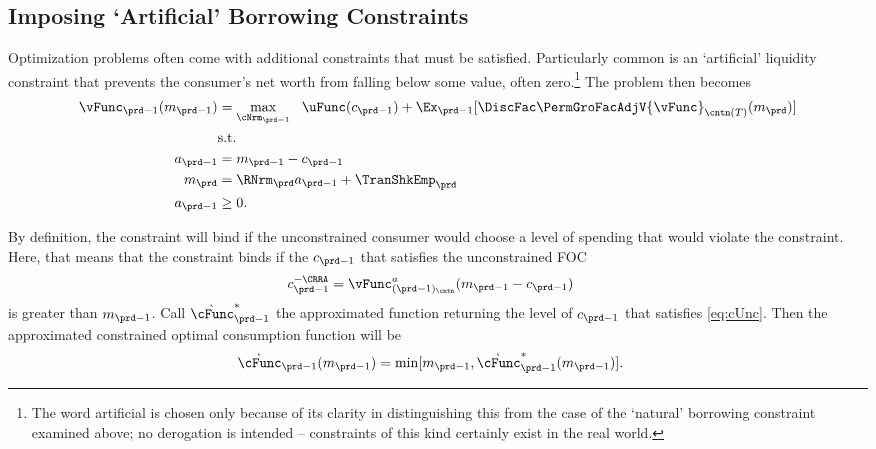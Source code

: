\subsection{Imposing `Artificial' Borrowing Constraints}

Optimization problems often come with additional constraints that must
be satisfied.  Particularly common is an `artificial' liquidity constraint that
prevents the consumer's net worth from falling below some value, often
zero.\footnote{The word artificial is chosen only because of its clarity in distinguishing
  this from the case of the `natural' borrowing constraint examined above; no derogation is
  intended -- constraints of this kind certainly exist in the real world.}  The problem then becomes
\begin{equation*}\begin{gathered}\begin{aligned}
      {\vFunc}_{\prd-1}({m}_{\prd-1})  & = \max_{\cNrm_{\prd-1}} ~~ \uFunc({c}_{\prd-1}) + \Ex_{\prd-1} [\DiscFac \PermGroFacAdjV{\vFunc}_{\cntn(T)}({m}_{\prd})] \label{eq:ConstrArt}
      \\ & \mbox{s.t.}  \nonumber
      \\ {a}_{\prd-1}  & = {m}_{\prd-1} - {c}_{\prd-1}
      \\ {m}_{\prd}  & = \RNrm_{\prd} {a}_{\prd-1} + \TranShkEmp_{\prd}
      \\ {a}_{\prd-1} & \geq 0 .
    \end{aligned}\end{gathered}\end{equation*}


By definition, the constraint will bind if the unconstrained consumer
would choose a level of spending that would violate the constraint.
Here, that means that the constraint binds if the ${c}_{\prd-1}$
that satisfies the unconstrained FOC
\begin{equation}\begin{gathered}\begin{aligned}
      {c}_{\prd-1}^{-\CRRA}  & = \vFunc^{{a}}_{({\prd-1})_\cntn}({m}_{\prd-1}-{c}_{\prd-1}) \label{eq:cUnc}
    \end{aligned}\end{gathered}\end{equation}
is greater than ${m}_{\prd-1}$.  Call $\grave{\cFunc}^{\ast}_{\prd-1}$ the approximated function
returning the level of ${c}_{\prd-1}$ that satisfies \eqref{eq:cUnc}.
Then the approximated constrained optimal consumption function will be
  \begin{equation}\begin{gathered}\begin{aligned}
        \grave{\cFunc}_{\prd-1}({m}_{\prd-1})  & = \min[{m}_{\prd-1},\grave{\cFunc}^{\ast}_{\prd-1}({m}_{\prd-1})] \label{eq:LiqCons}.
      \end{aligned}\end{gathered}\end{equation}


